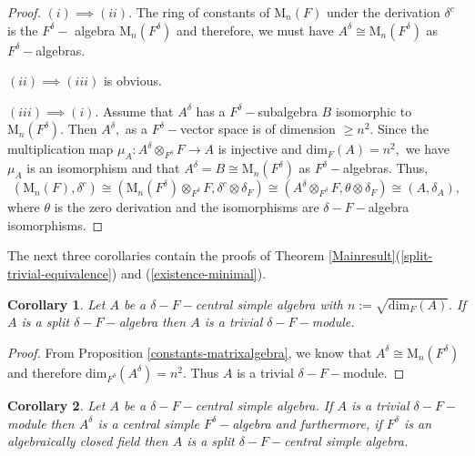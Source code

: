 \documentclass[preprint, 11pt]{amsart}
\theoremstyle{corollary}
\newtheorem{corollary}{Corollary}[theorem]
\theoremstyle{remark}
\theoremstyle{proposition}
\numberwithin{equation}{subsection}
\begin{document}
\begin{proof} $(i)\implies (ii).$ The ring of constants of $\mathrm{M}_n(F)$ under the derivation $\delta^c$ is the $F^{\delta}-$ algebra $\mathrm{M}_n(F^{\delta})$ and therefore, we must have $A^{\delta}\cong \mathrm{M}_n(F^{\delta})$ as $F^{\delta}-$algebras. 
	\item $(ii)\implies (iii)$ is obvious. 
	\item $(iii)\implies (i).$  Assume that $A^{\delta}$ has a $F^{\delta}-$subalgebra  $B$ isomorphic to $\mathrm{M}_n(F^{\delta}).$ Then $A^{\delta},$ as a $F^{\delta}-$vector space is of dimension $\geq n^2.$ Since the multiplication map $\mu_A: A^{\delta} \otimes_{F^\delta} F\to A$ is injective and $\mathrm{dim}_F(A )=n^2,$ we have $\mu_A$ is an isomorphism and that $A^{\delta}=B\cong \mathrm{M}_n(F^{\delta})$ as $F^{\delta}-$algebras. Thus, $$(\mathrm{M}_n(F), \delta^c)\cong \left(\mathrm{M}_n(F^{\delta})\otimes_{F^{\delta}} F, \delta^c\otimes \delta_F\right)\cong \left(A^{\delta} \otimes_{F^{\delta}} F, \theta\otimes  \delta_F\right)\cong (A, \delta_A),$$ where $\theta$ is the zero derivation and the isomorphisms are  $\delta-F-$algebra isomorphisms. 	\end{proof}

The next three corollaries contain the proofs of Theorem \ref{Mainresult}(\ref{split-trivial-equivalence}) and (\ref{existence-minimal}).

\begin{corollary}\label{splitimpliestrivial}
	Let $A$ be a $\delta-F-$central simple algebra with $n:=\sqrt{\mathrm{dim}_F(A)}.$ If $A$ is a split $\delta-F-$algebra then $A$ is a trivial $\delta-F-$module.
	\end{corollary}

\begin{proof}
From Proposition \ref{constants-matrixalgebra},	 we know that $A^{\delta}\cong \mathrm{M}_n(F^{\delta})$ and therefore $\mathrm{dim}_{F^{\delta}}(A^{\delta}) =n^2.$ Thus $A$ is a trivial $\delta-F-$module.  
	\end{proof}

\begin{corollary}	\label{trivial-split} Let $A$ be a $\delta-F-$central simple algebra. If  $A$ is a trivial $\delta-F-$ module  then $A^{\delta}$ is a central simple $F^{\delta}-$algebra and furthermore, if $F^{\delta}$ is an algebraically closed field then $A$ is a split $\delta-F-$central simple algebra.
\end{corollary}
\end{document}
